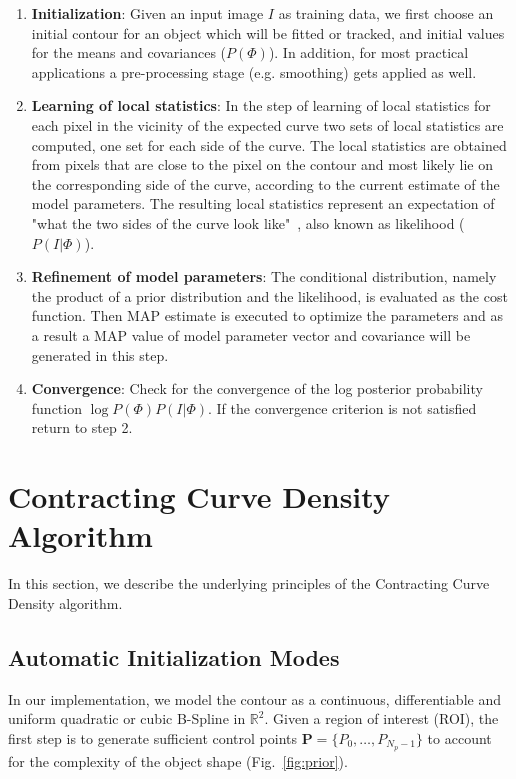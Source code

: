 \documentclass[conference]{IEEEtran}
\begin{document}
\begin{enumerate}
\item \textbf{Initialization}: Given an input image $I$ as training data, we first choose an initial
  contour for an object which will be fitted or tracked, and
  initial values for the means and covariances ($P(\Phi)$). In addition, for most practical
  applications a pre-processing stage (e.g. smoothing) gets applied as well.
\item \textbf{Learning of local statistics}: 
  In the step of learning of local statistics for each pixel in the
  vicinity of the expected curve two sets of local statistics
  are computed, one set for each side of the curve. The local statistics are obtained from
  pixels that are close to the pixel on the contour and most likely lie
  on the corresponding side of the curve, according to the current
  estimate of the model parameters. The resulting local statistics
  represent an expectation of "what the two sides of the curve look
  like"~\cite{hanek2004contracting}, also known as likelihood ($P(I|\Phi)$).
\item \textbf{Refinement of model parameters}: The conditional distribution, namely
  the product of a prior distribution and the likelihood, is evaluated
  as the cost function. Then MAP estimate is executed to optimize the
  parameters and as a result a MAP value of model parameter vector and
  covariance will be generated in this step.
\item \textbf{Convergence}: Check for the convergence of the 
  log posterior probability function $\log{P(\Phi) P(I|\Phi)}$. 
  If the convergence criterion is not satisfied return to step 2.
\end{enumerate}

\section{Contracting Curve Density Algorithm}
\label{sec:ccd_novelties}
In this section, we describe the underlying principles of the Contracting Curve Density
algorithm.

\subsection{Automatic Initialization Modes}
In our implementation, we model the
contour as a continuous, differentiable and uniform quadratic or cubic
B-Spline in $\mathbb{R}^2$.
Given a region of interest (ROI), the first step is to generate
sufficient control points $\mathbf{P} = \{P_0, \ldots, P_{N_p-1}\}$ to
account for the complexity of the object shape (Fig.~\ref{fig:prior}).
\end{document}
